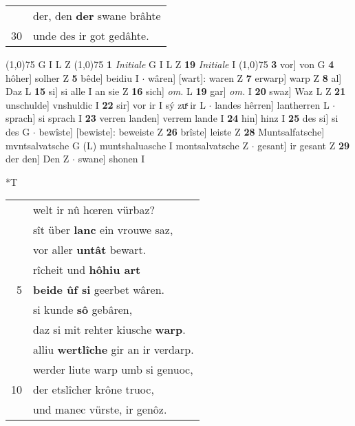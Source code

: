 \documentclass[8pt,a4paper,notitlepage]{article}
\begin{document}
\begin{table}[ht]
\begin{minipage}[t]{0.5\linewidth}
\begin{tabular}{rl}
 & der, den \textbf{der} swane brâhte\\ 
30 & unde des ir got gedâhte.\\ 
\end{tabular}
\scriptsize
\line(1,0){75} \newline
G I L Z \newline
\line(1,0){75} \newline
\textbf{1} \textit{Initiale} G I L Z  \textbf{19} \textit{Initiale} I  \newline
\line(1,0){75} \newline
\textbf{3} vor] von G \textbf{4} hôher] solher Z \textbf{5} bêde] beidiu I  $\cdot$ wâren] [wart]: waren Z \textbf{7} erwarp] warp Z \textbf{8} al] Daz L \textbf{15} si] si alle I an sie Z \textbf{16} sich] \textit{om.} L \textbf{19} gar] \textit{om.} I \textbf{20} swaz] Waz L Z \textbf{21} unschulde] vnshuldic I \textbf{22} sir] vor ir I sý zuͯ ir L  $\cdot$ landes hêrren] lantherren L  $\cdot$ sprach] si sprach I \textbf{23} verren landen] verrem lande I \textbf{24} hin] hinz I \textbf{25} des si] si des G  $\cdot$ bewîste] [bewiste]: beweiste Z \textbf{26} brîste] leiste Z \textbf{28} Muntsalfatsche] mvntsalvatsche G (L) muntshaluasche I montsalvatsche Z  $\cdot$ gesant] ir gesant Z \textbf{29} der den] Den Z  $\cdot$ swane] shonen I \newline
\end{minipage}
\hspace{0.5cm}
\begin{minipage}[t]{0.5\linewidth}
\small
\begin{center}*T
\end{center}
\begin{tabular}{rl}
 & welt ir nû hœren vürbaz?\\ 
 & sît über \textbf{lanc} ein vrouwe saz,\\ 
 & vor aller \textbf{untât} bewart.\\ 
 & rîcheit und \textbf{hôhiu art}\\ 
5 & \textbf{beide ûf si} geerbet wâren.\\ 
 & si kunde \textbf{sô} gebâren,\\ 
 & daz si mit rehter kiusche \textbf{warp}.\\ 
 & alliu \textbf{wertlîche} gir an ir verdarp.\\ 
 & werder liute warp umb si genuoc,\\ 
10 & der etslîcher krône truoc,\\ 
 & und manec vürste, ir genôz.\\ 

\end{tabular}
\end{minipage}
\end{table}
\end{document}
